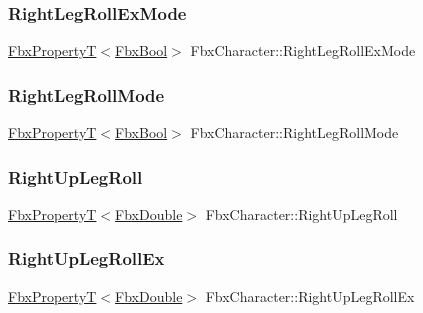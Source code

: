 \subsubsection{\texorpdfstring{Right\+Leg\+Roll\+Ex\+Mode}{RightLegRollExMode}}
{\footnotesize\ttfamily \hyperlink{class_fbx_property_t}{Fbx\+PropertyT}$<$\hyperlink{fbxtypes_8h_a92e0562b2fe33e76a242f498b362262e}{Fbx\+Bool}$>$ Fbx\+Character\+::\+Right\+Leg\+Roll\+Ex\+Mode}

\mbox{\label{class_fbx_character_ad8adb21239c56498bd85e983931c825b}} 
\subsubsection{\texorpdfstring{Right\+Leg\+Roll\+Mode}{RightLegRollMode}}
{\footnotesize\ttfamily \hyperlink{class_fbx_property_t}{Fbx\+PropertyT}$<$\hyperlink{fbxtypes_8h_a92e0562b2fe33e76a242f498b362262e}{Fbx\+Bool}$>$ Fbx\+Character\+::\+Right\+Leg\+Roll\+Mode}

\mbox{\label{class_fbx_character_a32c6ee078b478ecc10b0c021b515db26}} 
\subsubsection{\texorpdfstring{Right\+Up\+Leg\+Roll}{RightUpLegRoll}}
{\footnotesize\ttfamily \hyperlink{class_fbx_property_t}{Fbx\+PropertyT}$<$\hyperlink{fbxtypes_8h_a171e72a1c46fc15c1a6c9c31948c1c5b}{Fbx\+Double}$>$ Fbx\+Character\+::\+Right\+Up\+Leg\+Roll}

\mbox{\label{class_fbx_character_a5329916e950ff24a4280efc89cf27929}} 
\subsubsection{\texorpdfstring{Right\+Up\+Leg\+Roll\+Ex}{RightUpLegRollEx}}
{\footnotesize\ttfamily \hyperlink{class_fbx_property_t}{Fbx\+PropertyT}$<$\hyperlink{fbxtypes_8h_a171e72a1c46fc15c1a6c9c31948c1c5b}{Fbx\+Double}$>$ Fbx\+Character\+::\+Right\+Up\+Leg\+Roll\+Ex}

